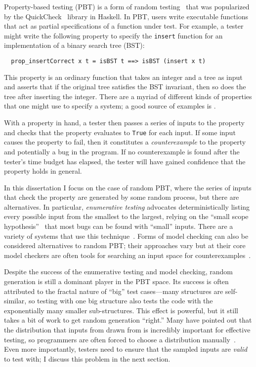 %
%
Property-based testing (PBT) is a form of random testing~\cite{hamlet1994random}
that was popularized by the QuickCheck~\cite{DBLP:conf/icfp/ClaessenH00} library
in Haskell. In PBT, users write executable functions that act as partial
specifications of a function under test. For example, a tester might write the
following property to specify the \lstinline{insert} function for an
implementation of a binary search tree (BST):
\begin{lstlisting}
  prop_insertCorrect x t = isBST t ==> isBST (insert x t)
\end{lstlisting}
This property is an ordinary function that takes an integer and a tree as input
and asserts that if the original tree satisfies the BST invariant, then so does
the tree after inserting the integer. There are a myriad of different kinds of
properties that one might use to specify a system; a good source of examples is
\citet{HowToSpecifyIt}.

With a property in hand, a tester then passes a series of inputs to the property
and checks that the property evaluates to \lstinline{True} for each input.  If
some input causes the property to fail, then it constitutes a {\em
counterexample} to the property and potentially a bug in the program. If no
counterexample is found after the tester's time budget has elapsed, the tester
will have gained confidence that the property holds in general.

In this dissertation I focus on the case of random PBT, where the series of
inputs that check the property are generated by some random process, but there
are alternatives. In particular, {\em enumerative testing} advocates
deterministically listing every possible input from the smallest to the largest,
relying on the ``small scope hypothesis''~\cite{jackson1996elements} that most
bugs can be found with ``small'' inputs. There are a variety of systems that use
this technique~\cite{DBLP:conf/haskell/RuncimanNL08,leancheck}. Forms of model
checking can also be considered alternatives to random PBT; their approaches
vary but at their core model checkers are often tools for searching an input
space for counterexamples~\cite{biere2009bounded}.

Despite the success of the enumerative testing and model checking, random
generation is still a dominant player in the PBT space. Its success is often
attributed to the fractal nature of ``big'' test cases---many structures are
self-similar, so testing with one big structure also tests the code with the
exponentially many smaller sub-structures. This effect is powerful, but it still
takes a bit of work to get random generation ``right.'' Many have pointed out
that the distribution that inputs from drawn from is incredibly important for
effective testing, so programmers are often forced to choose a distribution
manually~\cite{DBLP:conf/icfp/ClaessenH00}. Even more importantly, testers need
to ensure that the sampled inputs are {\em valid} to test with; I discuss this
problem in the next section.

